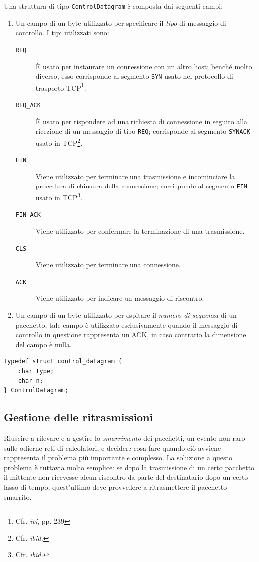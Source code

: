 \documentclass[10pt,a4paper, titlepage]{report}
\begin{document}
Una struttura di tipo \texttt{ControlDatagram} è composta dai seguenti campi:
\begin{enumerate}
\item Un campo di un byte utilizzato per specificare il \textit{tipo} di messaggio di controllo. I tipi utilizzati sono:
\begin{description}
\item[\texttt{REQ}] È usato per instaurare un connessione con un altro host; benché molto diverso, esso corrisponde al segmento \texttt{SYN} usato nel protocollo di trasporto TCP\footnote{Cfr. \textit{ivi}, pp. 239}.
\item[\texttt{REQ\_ACK}] È usato per rispondere ad una richiesta di connessione in seguito alla ricezione di un messaggio di tipo \texttt{REQ}; corrisponde al segmento \texttt{SYNACK} usato in TCP\footnote{Cfr. \textit{ibid.}}.
\item[\texttt{FIN}] Viene utilizzato per terminare una trasmissione e incominciare la procedura di chiusura della connessione; corrisponde al segmento \texttt{FIN} usato in TCP\footnote{Cfr. \textit{ibid.}}.
\item[\texttt{FIN\_ACK}] Viene utilizzato per confermare la terminazione di una trasmissione. 
\item[\texttt{CLS}] Viene utilizzato per terminare una connessione. 
\item[\texttt{ACK}] Viene utilizzato per indicare un messaggio di riscontro.
\end{description}

\item Un campo di un byte utilizzato per ospitare il \textit{numero di sequenza} di un pacchetto; tale campo è utilizzato esclusivamente quando il messaggio di controllo in questione rappresenta un ACK, in caso contrario la dimensione del campo è nulla.
\end{enumerate}

\begin{lstlisting}[frame=lines, caption={Implementazione della struttura \texttt{ControlDatagram}}, label={code:ControlDatagram}]
typedef struct control_datagram {
	char type;
	char n;
} ControlDatagram;
\end{lstlisting}

\subsection{Gestione delle ritrasmissioni}\label{subsec:ritrasmissioni}

Riuscire a rilevare e a gestire lo \textit{smarrimento} dei pacchetti, un evento non raro sulle odierne reti di calcolatori, e decidere cosa fare quando ciò avviene rappresenta il problema più importante e complesso. La soluzione a questo problema è tuttavia molto semplice: se dopo la trasmissione di un certo pacchetto il mittente non ricevesse alcun riscontro da parte del destinatario dopo un certo lasso di tempo, quest'ultimo deve provvedere a ritrasmettere il pacchetto smarrito. 
\end{document}

